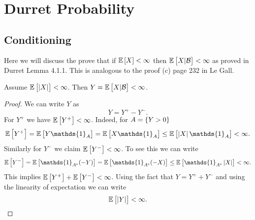 \chapter{Durret Probability}

\section{Conditioning}

Here we will discuss the prove that if $ \mathbb{E}\left[X\right] < \infty $ then $ \mathbb{E}\left[X|\mathcal{B}\right] < \infty $ as proved in Durret Lemma 4.1.1. This is analogous to the proof (c) page 232 in Le Gall. 
\begin{proposition}
	Assume $ \mathbb{E}\left[|X|\right] < \infty $. Then $ Y = \mathbb{E}\left[X|\mathcal{B}\right] < \infty $.
\end{proposition}
\begin{proof}
	We can write $ Y $ as
	\[ Y = Y^+ - Y^-. \]
	For $ Y^+ $ we have $ \mathbb{E}\left[Y^+\right] < \infty $. Indeed, for $ A = \{Y > 0\} $
	\[ \E{Y^+} = \E{Y\mathds{1}_{A} } = \E{X\mathds{1}_A} \leq \E{\abs{X}\mathds{1}_A} < \infty. \] 
	Similarly for $ Y^- $ we claim $ \mathbb{E}\left[Y^-\right] < \infty $. To see this we can write
	\[ \E{Y^-} = \E{\mathds{1}_{A^c} (-Y)} = \E{\mathds{1}_{A^c} (-X)} \leq \E{\mathds{1}_{A^c}\abs{X}} < \infty. \]
	This implies $ \mathbb{E}\left[Y^+\right] + \mathbb{E}\left[Y^-\right] < \infty $. Using the fact that $ Y = Y^+ + Y^- $ and using the linearity of expectation we can write
	\[ \mathbb{E}\left[\left|Y\right|\right] < \infty. \]
\end{proof}

